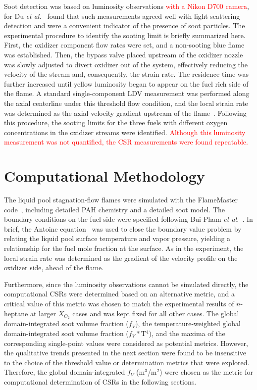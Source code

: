 \documentclass[review,3p,times]{elsarticleUS}
\begin{document}
Soot detection was based on luminosity observations \textcolor{red}{with a Nikon D700 camera}, for Du \emph{et al.}~\cite{du89} found that such measurements agreed well with light scattering detection and were a convenient indicator of the presence of soot particles. The experimental procedure to identify the sooting limit is briefly summarized here. First, the oxidizer component flow rates were set, and a non-sooting blue flame was established. Then, the bypass valve placed upstream of the oxidizer nozzle was slowly adjusted to divert oxidizer out of the system, effectively reducing the velocity of the stream and, consequently, the strain rate. The residence time was further increased until yellow luminosity began to appear on the fuel rich side of the flame. A standard single-component LDV measurement was performed along the axial centerline under this threshold flow condition, and the local strain rate was determined as the axial velocity gradient upstream of the flame~\cite{du89}. Following this procedure, the sooting limits for the three fuels with different oxygen concentrations in the oxidizer streams were identified.  \textcolor{red}{Although this luminosity measurement was not quantified, the CSR measurements were found repeatable.}

\section{Computational Methodology}

The liquid pool stagnation-flow flames were simulated with the FlameMaster code~\cite{flamemaster}, including detailed PAH chemistry and a detailed soot model. The boundary conditions on the fuel side were specified following Bui-Pham \emph{et al.}~\cite{buipham91}. In brief, the Antoine equation~\cite{polingbook} was used to close the boundary value problem by relating the liquid pool surface temperature and vapor pressure, yielding a relationship for the fuel mole fraction at the surface. As in the experiment, the local strain rate was determined as the gradient of the velocity profile on the oxidizer side, ahead of the flame. 

Furthermore, since the luminosity observations cannot be simulated directly, the computational CSRs were determined based on an alternative metric, and a critical value of this metric was chosen to match the experimental results of $n$-heptane at larger $X_{O_2}$ cases and was kept fixed for all other cases.  The global domain-integrated soot volume fraction ($f_V$), the temperature-weighted global domain-integrated soot volume fraction ($f_V*$T$^4$), and the maxima of the corresponding single-point values were considered as potential metrics.  However, the qualitative trends presented in the next section were found to be insensitive to the choice of the threshold value or determination metrics that were explored.  Therefore, the global domain-integrated $f_V$ (m$^3$/m$^2$) were chosen as the metric for computational determination of CSRs in the following sections.
\end{document}
